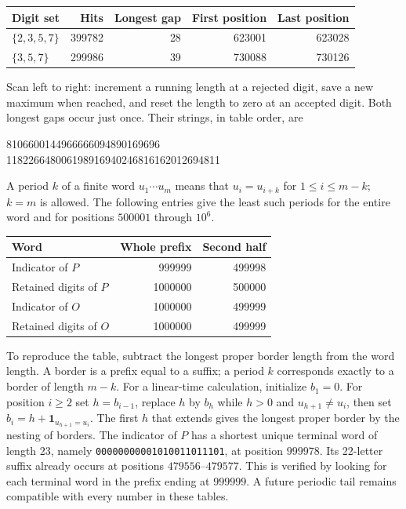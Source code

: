 \documentclass[11pt,a4paper]{article}
\theoremstyle{definition}\newtheorem{definition}[theorem]{Definition}\newtheorem{example}[theorem]{Example}
\theoremstyle{remark}\newtheorem{remark}[theorem]{Remark}
\begin{document}
\begin{center}\small
\begin{tabular}{lrrrr}
Digit set & Hits & Longest gap & First position & Last position\\ \hline
$\{2,3,5,7\}$ &399782&28&623001&623028\\
$\{3,5,7\}$   &299986&39&730088&730126
\end{tabular}
\end{center}
Scan left to right: increment a running length at a rejected digit, save a
new maximum when reached, and reset the length to zero at an accepted digit.
Both longest gaps occur just once. Their strings, in table order, are
\begin{center}\ttfamily\small
8106600144966666094890169696\\
118226648006198916940246816162012694811
\end{center}

A period $k$ of a finite word $u_1\cdots u_m$ means that $u_i=u_{i+k}$
for $1\le i\le m-k$; $k=m$ is allowed. The following entries give the least
such periods for the entire word and for positions $500001$ through $10^6$.
\begin{center}\small
\begin{tabular}{lrr}
Word & Whole prefix & Second half \\ \hline
Indicator of $P$ &999999&499998\\
Retained digits of $P$ &1000000&500000\\
Indicator of $O$ &1000000&499999\\
Retained digits of $O$ &1000000&499999
\end{tabular}
\end{center}
To reproduce the table, subtract the longest proper border length from the
word length. A border is a prefix equal to a suffix; a period $k$ corresponds
exactly to a border of length $m-k$. For a linear-time calculation, initialize
$b_1=0$. For position $i\ge2$ set $h=b_{i-1}$, replace $h$ by $b_h$ while
$h>0$ and $u_{h+1}\ne u_i$, then set $b_i=h+\mathbf1_{u_{h+1}=u_i}$.
The first $h$ that extends gives the longest proper border by the nesting of
borders. The indicator of $P$ has a shortest unique terminal word of length
23, namely \texttt{00000000001010011011101}, at position $999978$. Its
22-letter suffix already occurs at positions $479556$--$479577$. This is
verified by looking for each terminal word in the prefix ending at $999999$.
A future periodic tail remains compatible with every number in these tables.
\end{document}

